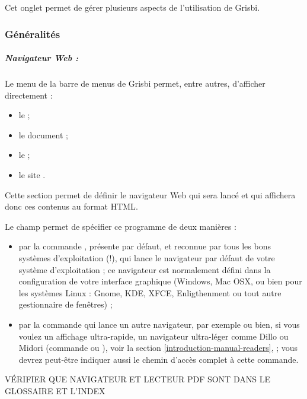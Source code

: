 Cet onglet permet de gérer plusieurs aspects de l'utilisation de Grisbi. 


\subsubsection{Généralités\label{setup-general-various-general}}


\subparagraph{Navigateur Web :\label{setup-general-various-general-browser}}

Le menu  de la barre de menus de Grisbi permet, entre autres, d'afficher directement :

\begin{itemize}
	\item le  ;
	\item le document  ;
	\item le  ;
	\item le site .
\end{itemize}

Cette section permet de définir le navigateur Web qui sera lancé et qui affichera donc ces contenus au format \gls{HTML}. 

Le champ  permet de spécifier ce programme de deux manières : 

\begin{itemize}
	\item par la commande , présente par défaut, et reconnue par tous les bons systèmes d'exploitation (!), qui lance le navigateur par défaut de votre système d'exploitation ; ce navigateur est normalement défini dans la configuration de votre interface graphique (Windows, Mac OSX, ou bien pour les systèmes Linux : Gnome, KDE, XFCE, Enligthenment ou tout autre gestionnaire de fenêtres) ;
	\item  par la commande qui lance un autre navigateur, par exemple  ou bien, si vous voulez un affichage ultra-rapide, un navigateur ultra-léger comme Dillo ou Midori (commande  ou ), voir la section \vref{introduction-manual-readers},  ; vous devrez peut-être indiquer aussi le chemin d'accès complet à cette commande.
\end{itemize}


VÉRIFIER QUE NAVIGATEUR ET LECTEUR PDF SONT DANS LE GLOSSAIRE ET L'INDEX


%


